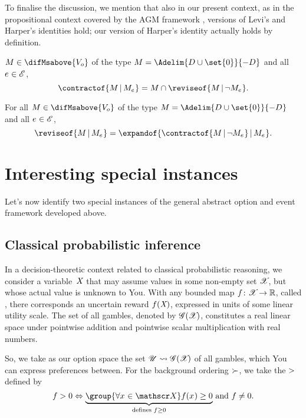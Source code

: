 \documentclass[preprint]{isipta2025}
\begin{document}
To finalise the discussion, we mention that also in our present context, as in the propositional context covered by the AGM framework \cite{alchourron1985,gardenfors1988}, versions of Levi's and Harper's identities hold; our version of Harper's identity actually holds by definition.

\begin{proposition}\label{prop:identity:harper}
\(M\in\difMsabove{\zeroM}\) of the type \(\M=\Adelim{\desirset\cup\set{0}}{-\desirset}\) and all \(e_{}\in\mathscr{E}\),
\begin{equation*}
\contractof{\M\given\eventM}
=\M\intersection\reviseof{\M\given\neg\eventM}.
\end{equation*}
\end{proposition}

\begin{proposition}\label{prop:identity:levi}
For all \(M\in\difMsabove{\zeroM}\) of the type \(\M=\Adelim{\desirset\cup\set{0}}{-\desirset}\) and all \(e_{}\in\mathscr{E}\),
\begin{equation*}
\reviseof{\M\given\eventM}
=\expandof{\contractof{\M\given\neg\eventM}\given\eventM}.
\end{equation*}
\end{proposition}

\section{Interesting special instances}\label{sec::instances}
Let's now identify two special instances of the general abstract option and event framework developed above.

\subsection{Classical probabilistic inference}
In a decision-theoretic context related to classical probabilistic reasoning, we consider a variable~\({\mathit{X}_{}}\) that may assume values in some non-empty set \(\mathscr{X}_{}\), but whose actual value is unknown to You.
With any bounded map \(f\colon\mathscr{X}_{}\to\mathbb{R}\), called , there corresponds an uncertain reward \(f({\mathit{X}_{}})\), expressed in units of some linear utility scale.
The set of all gambles, denoted by \(\mathscr{\mathscr{G}}(\mathscr{X}_{})\), constitutes a real linear space under pointwise addition and pointwise scalar multiplication with real numbers.

So, we take as our option space the set \(\mathscr{U}\rightsquigarrow\mathscr{\mathscr{G}}(\mathscr{X}_{})\) of all gambles, which You can express preferences between.
For the background ordering \(\mathrel{\succ_{}}\), we take the  \(>\) defined by
\begin{equation*}
\gbl\weakgt0
\ifandonlyif\underset{\textrm{defines }\gbl\weakgeq0}{\underbrace{\group{\forall\state\in\states}\gbl(\state)\geq0}}
\text{ and }\gbl\neq0.
\end{equation*}
\end{document}
